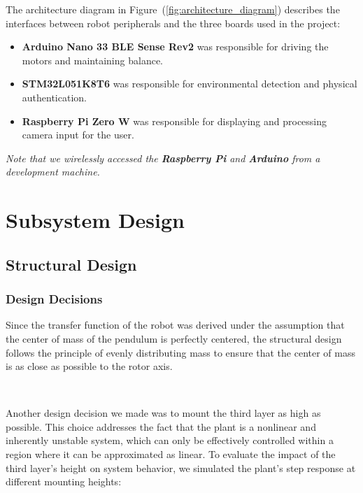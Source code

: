 \documentclass{article}
\begin{document}
\begin{minipage}{\linewidth}
    The architecture diagram in Figure~(\ref{fig:architecture_diagram}) describes the interfaces between robot peripherals and the three boards
    used in the project: \\
\end{minipage}

\begin{itemize}
    \item \textbf{Arduino Nano 33 BLE Sense Rev2} was responsible for driving the motors and maintaining balance.
    \item \textbf{STM32L051K8T6} was responsible for environmental detection and physical authentication.
    \item \textbf{Raspberry Pi Zero W} was responsible for displaying and processing camera input for the user.
\end{itemize}

\textit{Note that we wirelessly accessed the \textbf{Raspberry Pi} and \textbf{Arduino} from a development machine.}

\section{Subsystem Design}

\subsection{Structural Design}

\subsubsection{Design Decisions}
Since the transfer function of the robot was derived under the assumption that
the center of mass of the pendulum is perfectly centered, the structural design
follows the principle of evenly distributing mass to ensure that the center of
mass is as close as possible to the rotor axis.

\


Another design decision we made was to mount the third layer as high as
possible. This choice addresses the fact that the plant is a nonlinear and
inherently unstable system, which can only be effectively controlled within a
region where it can be approximated as linear. To evaluate the impact of the
third layer's height on system behavior, we simulated the plant's step response
at different mounting heights:
\end{document}
